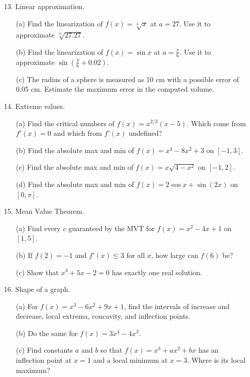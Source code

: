 \documentclass[12pt]{article}
\newcommand\parens[1]{\left( #1 \right)}
\begin{document}
\begin{enumerate}
\begin{enumerate}
\end{enumerate}
\item[13.] Linear approximation.
\begin{enumerate}
\item[(a)] Find the linearization of $f(x) = \sqrt[3]{x}$ at $a=27$. Use it to approximate $\sqrt[3]{27.27}$.
\item[(b)] Find the linearization of $f(x) = \sin x$ at $a = \frac{\pi}{6}$. Use it to approximate $\sin\parens{\frac{\pi}{6} + 0.02}$.
\item[(c)] The radius of a sphere is measured as 10 cm with a possible error of 0.05 cm. Estimate the maximum error in the computed volume.
\end{enumerate}
\item[14.] Extreme values.
\begin{enumerate}
\item[(a)] Find the critical numbers of $f(x) = x^{2/3}(x-5)$. Which come from $f'(x) = 0$ and which from $f'(x)$ undefined?
\item[(b)] Find the absolute max and min of $f(x) = x^4 - 8x^2 + 3$ on $[-1,3]$.
\item[(c)] Find the absolute max and min of $f(x) = x\sqrt{4-x^2}$ on $[-1,2]$.
\item[(d)] Find the absolute max and min of $f(x) = 2\cos x + \sin(2x)$ on $[0, \pi]$.
\end{enumerate}
\item[15.] Mean Value Theorem.
\begin{enumerate}
\item[(a)] Find every $c$ guaranteed by the MVT for $f(x) = x^2 - 4x + 1$ on $[1,5]$.
\item[(b)] If $f(2) = -1$ and $f'(x) \leq 3$ for all $x$, how large can $f(6)$ be?
\item[(c)] Show that $x^3 + 5x - 2 = 0$ has exactly one real solution.
\end{enumerate}
\item[16.] Shape of a graph.
\begin{enumerate}
\item[(a)] For $f(x) = x^3 - 6x^2 + 9x + 1$, find the intervals of increase and decrease, local extrema, concavity, and inflection points.
\item[(b)] Do the same for $f(x) = 3x^4 - 4x^3$.
\item[(c)] Find constants $a$ and $b$ so that $f(x) = x^3 + ax^2 + bx$ has an inflection point at $x=1$ and a local minimum at $x=3$. Where is its local maximum?

\end{enumerate}
\end{enumerate}
\end{document}
